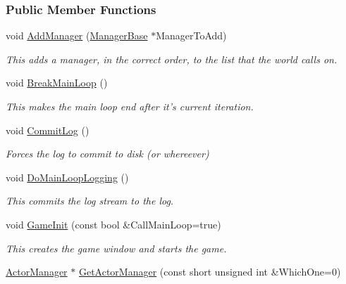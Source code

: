 \subsubsection*{Public Member Functions}
\begin{DoxyCompactItemize}
\item 
void \hyperlink{classphys_1_1World_aa709932e21d9d19a91ee38cd7a575556}{AddManager} (\hyperlink{classphys_1_1ManagerBase}{ManagerBase} $\ast$ManagerToAdd)
\begin{DoxyCompactList}\small\item\em This adds a manager, in the correct order, to the list that the world calls on. \item\end{DoxyCompactList}\item 
void \hyperlink{classphys_1_1World_a126dde1a91def5521a1ebc7aafeeaebd}{BreakMainLoop} ()
\begin{DoxyCompactList}\small\item\em This makes the main loop end after it's current iteration. \item\end{DoxyCompactList}\item 
void \hyperlink{classphys_1_1World_ae2b1c8d6e96f94d329769abbd43ab1d2}{CommitLog} ()
\begin{DoxyCompactList}\small\item\em Forces the log to commit to disk (or whereever) \item\end{DoxyCompactList}\item 
void \hyperlink{classphys_1_1World_a1461e6c9d16214aa2cc310035b149378}{DoMainLoopLogging} ()
\begin{DoxyCompactList}\small\item\em This commits the log stream to the log. \item\end{DoxyCompactList}\item 
void \hyperlink{classphys_1_1World_a21cc36be08a61f40619584d4c438936b}{GameInit} (const bool \&CallMainLoop=true)
\begin{DoxyCompactList}\small\item\em This creates the game window and starts the game. \item\end{DoxyCompactList}\item 
\hyperlink{classphys_1_1ActorManager}{ActorManager} $\ast$ \hyperlink{classphys_1_1World_abe5e7e90d42ed64aeddb339af40dd857}{GetActorManager} (const short unsigned int \&WhichOne=0)

\end{DoxyCompactItemize}
